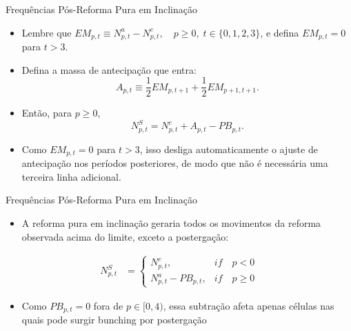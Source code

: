 \begin{frame}[label=pureS]{Frequências Pós-Reforma Pura em Inclinação}
    \begin{itemize}
        \item Lembre que $EM_{p,t}\equiv N^a_{p,t}-N^c_{p,t},
        \quad p\geq 0,\; t\in\{0,1,2,3\}$, e defina $EM_{p,t}=0$ para $t>3$.
        
        \item Defina a massa de antecipação que entra:
        \[
        A_{p,t}\equiv \frac12 EM_{p,t+1}+\frac12 EM_{p+1,t+1}.
        \]
        \item Então, para $p\geq 0$,
        \[
        N^S_{p,t}=N^c_{p,t}+A_{p,t}-PB_{p,t}.
        \]
         \item Como $EM_{p,t}=0$ para $t>3$, isso desliga automaticamente o ajuste de antecipação nos períodos posteriores, de modo que não é necessária uma terceira linha adicional.
    \end{itemize}
\end{frame}

\begin{frame}{Frequências Pós-Reforma Pura em Inclinação}
    \begin{itemize}
        \item A reforma pura em inclinação geraria todos os movimentos da reforma observada acima do limite, exceto a postergação:
    \end{itemize}
    \begin{align*}
            N^S_{p,t}&=\begin{cases} 
                N_{p,t}^c, & if\quad p<0 \\
                N_{p,t}^a - PB_{p,t}, & if\quad p\geq 0
            \end{cases}
        \end{align*}
    \begin{itemize}
        \item Como $PB_{p,t}=0$ fora de $p\in[0,4)$, essa subtração afeta apenas células nas quais pode surgir bunching por postergação
    \end{itemize}
\end{frame}

